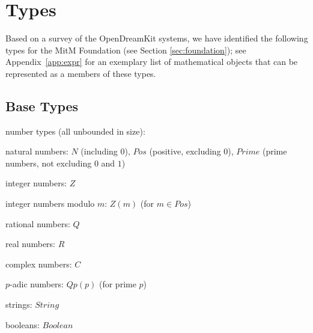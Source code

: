 \section{Types}\label{app:types}

Based on a survey of the OpenDreamKit systems, we have identified the following types for the MitM Foundation (see Section \ref{sec:foundation}); see Appendix~\ref{app:expr} for an exemplary list of mathematical objects that can be represented as a members of these types.

\subsection{Base Types}
\begin{compactitem}
 \item number types (all unbounded in size):
  \begin{compactitem}
   \item natural numbers: $N$ (including $0$), $Pos$ (positive, excluding $0$), $Prime$ (prime numbers, not excluding $0$ and $1$)
   \item integer numbers: $Z$
   \item integer numbers modulo $m$: $Z(m)$ (for $m\in Pos$)
   \item rational numbers: $Q$
   \item real numbers: $R$ 
   \item complex numbers: $C$
   \item $p$-adic numbers: $Qp(p)$ (for prime $p$)
  \end{compactitem}
 \item strings: $String$
 \item booleans: $Boolean$
 \end{compactitem}

